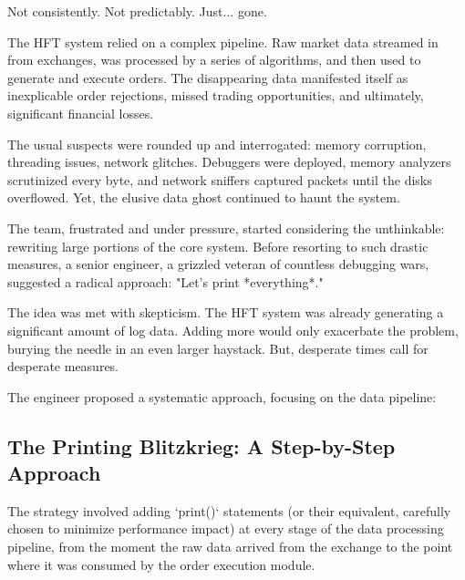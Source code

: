 \documentclass{article}
\begin{document}
{{{{Not consistently. Not predictably. Just... gone.

The HFT system relied on a complex pipeline. Raw market data streamed in from exchanges, was processed by a series of algorithms, and then used to generate and execute orders. The disappearing data manifested itself as inexplicable order rejections, missed trading opportunities, and ultimately, significant financial losses.

The usual suspects were rounded up and interrogated: memory corruption, threading issues, network glitches. Debuggers were deployed, memory analyzers scrutinized every byte, and network sniffers captured packets until the disks overflowed. Yet, the elusive data ghost continued to haunt the system.

The team, frustrated and under pressure, started considering the unthinkable: rewriting large portions of the core system. Before resorting to such drastic measures, a senior engineer, a grizzled veteran of countless debugging wars, suggested a radical approach: "Let's print *everything*."

The idea was met with skepticism. The HFT system was already generating a significant amount of log data. Adding more would only exacerbate the problem, burying the needle in an even larger haystack. But, desperate times call for desperate measures.

The engineer proposed a systematic approach, focusing on the data pipeline:

\subsection*{The Printing Blitzkrieg: A Step-by-Step Approach}

The strategy involved adding `print()` statements (or their equivalent, carefully chosen to minimize performance impact) at every stage of the data processing pipeline, from the moment the raw data arrived from the exchange to the point where it was consumed by the order execution module.

}}}}
\end{document}
